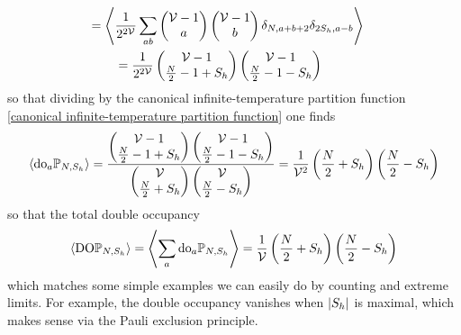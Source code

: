 \begin{align}
    \nonumber\\
    =\Bigg\langle & \frac{1}{2^{2\mathcal{V}}} \sum_{ab} \begin{pmatrix} \mathcal{V}-1 \\ a \end{pmatrix} \begin{pmatrix} \mathcal{V}-1 \\ b \end{pmatrix} \delta_{N,a+b+2} \delta_{2S_h,a-b} \Bigg\rangle
    \nonumber\\
    &= \frac{1}{2^{2\mathcal{V}}} \begin{pmatrix} \mathcal{V}-1 \\ \frac{N}{2}-1+S_h \end{pmatrix} \begin{pmatrix} \mathcal{V}-1 \\ \frac{N}{2}-1-S_h \end{pmatrix}
\end{align}
so that dividing by the canonical infinite-temperature partition function \eqref{canonical infinite-temperature partition function} one finds
\begin{align}
    \left\langle \textrm{do}_a \mathbb{P}_{N,S_h} \right\rangle
    =
    \frac{
        \begin{pmatrix} \mathcal{V}-1 \\ \frac{N}{2}-1+S_h \end{pmatrix} \begin{pmatrix} \mathcal{V}-1 \\ \frac{N}{2}-1-S_h \end{pmatrix}
    }{  \begin{pmatrix} \mathcal{V} \\ \frac{N}{2} + S_h \end{pmatrix} \begin{pmatrix} \mathcal{V} \\ \frac{N}{2}-S_h \end{pmatrix}}
    =
    \frac{1}{\mathcal{V}^2}\left(\frac{N}{2}+S_h\right)\left(\frac{N}{2}-S_h\right)
\end{align}
so that the total double occupancy 
\begin{align}
    \left\langle \textrm{DO} \mathbb{P}_{N,S_h} \right\rangle
    =
    \left\langle \sum_a \textrm{do}_a\mathbb{P}_{N,S_h} \right\rangle
    =
    \frac{1}{\mathcal{V}}\left(\frac{N}{2}+S_h\right)\left(\frac{N}{2}-S_h\right)
    \label{eq:infinite temperature Double Occupancy}
\end{align}
which matches some simple examples we can easily do by counting and extreme limits.
For example, the double occupancy vanishes when $\left| S_h \right|$ is maximal, which makes sense via the Pauli exclusion principle.
